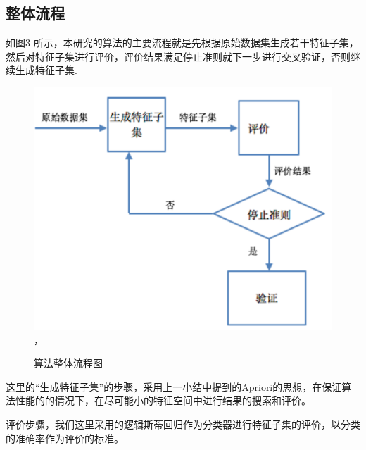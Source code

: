 \documentclass{njubachelor}
\begin{document}
\subsection{整体流程}
如图3 所示，本研究的算法的主要流程就是先根据原始数据集生成若干特征子集，然后对特征子集进行评价，评价结果满足停止准则就下一步进行交叉验证，否则继续生成特征子集.
\begin{figure}[!ht]
    \centering
    \includegraphics[width=4.5in]{pic/fig3}， 
    \caption{算法整体流程图}
\end{figure}

这里的“生成特征子集”的步骤，采用上一小结中提到的Apriori的思想，在保证算法性能的的情况下，在尽可能小的特征空间中进行结果的搜索和评价。

评价步骤，我们这里采用的逻辑斯蒂回归作为分类器进行特征子集的评价，以分类的准确率作为评价的标准。
\end{document}
